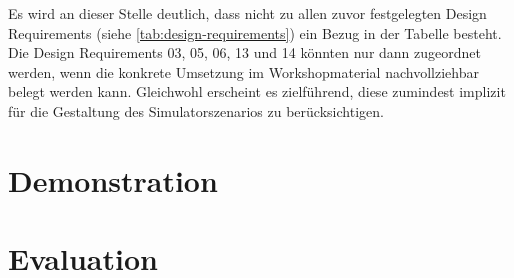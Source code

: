 Es wird an dieser Stelle deutlich, dass nicht zu allen zuvor festgelegten Design Requirements (siehe \ref{tab:design-requirements}) ein Bezug in der Tabelle besteht. Die Design Requirements 03, 05, 06, 13 und 14 könnten nur dann zugeordnet werden, wenn die konkrete Umsetzung im Workshopmaterial nachvollziehbar belegt werden kann. Gleichwohl erscheint es zielführend, diese zumindest implizit für die Gestaltung des Simulatorszenarios zu berücksichtigen.   

\section{Demonstration}
\label{Ergebnisse_Phase_vier}

\section{Evaluation}
\label{Ergebnisse_Phase_fünf}